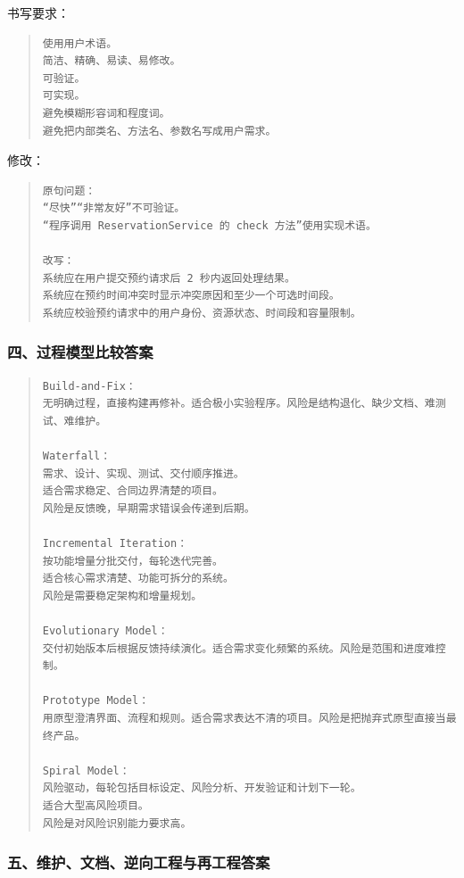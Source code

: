 \documentclass[UTF8,zihao=-4]{ctexart}
\begin{document}
书写要求：


\begin{quote}
\footnotesize
\begin{verbatim}
使用用户术语。
简洁、精确、易读、易修改。
可验证。
可实现。
避免模糊形容词和程度词。
避免把内部类名、方法名、参数名写成用户需求。
\end{verbatim}
\end{quote}


修改：


\begin{quote}
\footnotesize
\begin{verbatim}
原句问题：
“尽快”“非常友好”不可验证。
“程序调用 ReservationService 的 check 方法”使用实现术语。

改写：
系统应在用户提交预约请求后 2 秒内返回处理结果。
系统应在预约时间冲突时显示冲突原因和至少一个可选时间段。
系统应校验预约请求中的用户身份、资源状态、时间段和容量限制。
\end{verbatim}
\end{quote}


\subsubsection*{四、过程模型比较答案}


\begin{quote}
\footnotesize
\begin{verbatim}
Build-and-Fix：
无明确过程，直接构建再修补。适合极小实验程序。风险是结构退化、缺少文档、难测试、难维护。

Waterfall：
需求、设计、实现、测试、交付顺序推进。
适合需求稳定、合同边界清楚的项目。
风险是反馈晚，早期需求错误会传递到后期。

Incremental Iteration：
按功能增量分批交付，每轮迭代完善。
适合核心需求清楚、功能可拆分的系统。
风险是需要稳定架构和增量规划。

Evolutionary Model：
交付初始版本后根据反馈持续演化。适合需求变化频繁的系统。风险是范围和进度难控制。

Prototype Model：
用原型澄清界面、流程和规则。适合需求表达不清的项目。风险是把抛弃式原型直接当最终产品。

Spiral Model：
风险驱动，每轮包括目标设定、风险分析、开发验证和计划下一轮。
适合大型高风险项目。
风险是对风险识别能力要求高。
\end{verbatim}
\end{quote}


\subsubsection*{五、维护、文档、逆向工程与再工程答案}
\end{document}
